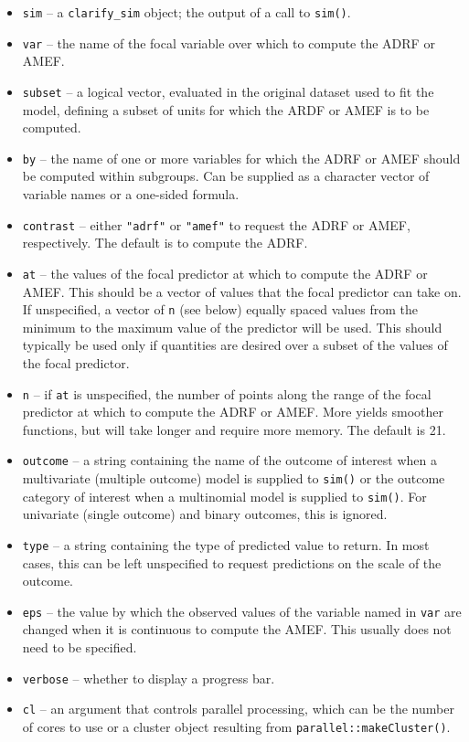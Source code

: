 \begin{itemize}
\tightlist
\item
  \texttt{sim} -- a \texttt{clarify\_sim} object; the output of a call to \texttt{sim()}.
\item
  \texttt{var} -- the name of the focal variable over which to compute the ADRF or AMEF.
\item
  \texttt{subset} -- a logical vector, evaluated in the original dataset used to fit the model, defining a subset of units for which the ARDF or AMEF is to be computed.
\item
  \texttt{by} -- the name of one or more variables for which the ADRF or AMEF should be computed within subgroups. Can be supplied as a character vector of variable names or a one-sided formula.
\item
  \texttt{contrast} -- either \texttt{"adrf"} or \texttt{"amef"} to request the ADRF or AMEF, respectively. The default is to compute the ADRF.
\item
  \texttt{at} -- the values of the focal predictor at which to compute the ADRF or AMEF. This should be a vector of values that the focal predictor can take on. If unspecified, a vector of \texttt{n} (see below) equally spaced values from the minimum to the maximum value of the predictor will be used. This should typically be used only if quantities are desired over a subset of the values of the focal predictor.
\item
  \texttt{n} -- if \texttt{at} is unspecified, the number of points along the range of the focal predictor at which to compute the ADRF or AMEF. More yields smoother functions, but will take longer and require more memory. The default is 21.
\item
  \texttt{outcome} -- a string containing the name of the outcome of interest when a multivariate (multiple outcome) model is supplied to \texttt{sim()} or the outcome category of interest when a multinomial model is supplied to \texttt{sim()}. For univariate (single outcome) and binary outcomes, this is ignored.
\item
  \texttt{type} -- a string containing the type of predicted value to return. In most cases, this can be left unspecified to request predictions on the scale of the outcome.
\item
  \texttt{eps} -- the value by which the observed values of the variable named in \texttt{var} are changed when it is continuous to compute the AMEF. This usually does not need to be specified.
\item
  \texttt{verbose} -- whether to display a progress bar.
\item
  \texttt{cl} -- an argument that controls parallel processing, which can be the number of cores to use or a cluster object resulting from \texttt{parallel::makeCluster()}.
\end{itemize}
